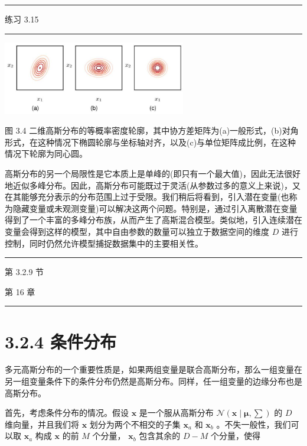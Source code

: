 \documentclass[10pt]{article}
\newcommand{\HRule}{\begin{center}\rule{0.9\linewidth}{0.2mm}\end{center}}
\begin{document}
\HRule

练习 3.15

\HRule

\begin{center}
\includegraphics[max width=0.6\textwidth]{images/0194e279-9b28-703a-88f4-c3ac21e2010d_95_699_344_842_337_0.jpg}
\end{center}
\hspace*{3em} 

图 3.4 二维高斯分布的等概率密度轮廓，其中协方差矩阵为(a)一般形式，(b)对角形式，在这种情况下椭圆轮廓与坐标轴对齐，以及(c)与单位矩阵成比例，在这种情况下轮廓为同心圆。

高斯分布的另一个局限性是它本质上是单峰的(即只有一个最大值)，因此无法很好地近似多峰分布。因此，高斯分布可能既过于灵活(从参数过多的意义上来说)，又在其能够充分表示的分布范围上过于受限。我们稍后将看到，引入潜在变量(也称为隐藏变量或未观测变量)可以解决这两个问题。特别是，通过引入离散潜在变量得到了一个丰富的多峰分布族，从而产生了高斯混合模型。类似地，引入连续潜在变量会得到这样的模型，其中自由参数的数量可以独立于数据空间的维度 \(D\) 进行控制，同时仍然允许模型捕捉数据集中的主要相关性。

\HRule

第 3.2.9 节

第 16 章

\HRule

\section*{3.2.4 条件分布}

多元高斯分布的一个重要性质是，如果两组变量是联合高斯分布，那么一组变量在另一组变量条件下的条件分布仍然是高斯分布。同样，任一组变量的边缘分布也是高斯分布。

首先，考虑条件分布的情况。假设 \(\mathbf{x}\) 是一个服从高斯分布 \(\mathcal{N}\left( {\mathbf{x} \mid  \mathbf{\mu },\mathbf{\sum }}\right)\) 的 \(D\) 维向量，并且我们将 \(\mathbf{x}\) 划分为两个不相交的子集 \({\mathbf{x}}_{a}\) 和 \({\mathbf{x}}_{b}\) 。不失一般性，我们可以取 \({\mathbf{x}}_{a}\) 构成 \(\mathbf{x}\) 的前 \(M\) 个分量， \({\mathbf{x}}_{b}\) 包含其余的 \(D - M\) 个分量，使得
\end{document}
